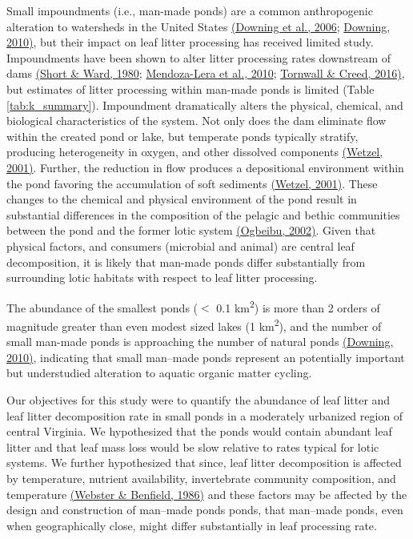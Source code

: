 \documentclass[12pt,letter]{article}
\begin{document}
Small impoundments (i.e., man-made ponds) are a common anthropogenic alteration to watersheds in the United States \hyperref[csl:26]{(Downing et al., 2006}; \hyperref[csl:27]{Downing, 2010)}, but their impact on leaf litter processing has received limited study. Impoundments have been shown to alter litter processing rates downstream of dams \hyperref[csl:28]{(Short \& Ward, 1980}; \hyperref[csl:29]{Mendoza-Lera et al., 2010}; \hyperref[csl:30]{Tornwall \& Creed, 2016)}, but estimates of litter processing within man-made ponds is limited (Table \ref{tab:k_summary}). Impoundment dramatically alters the physical, chemical, and biological characteristics of the system. Not only does the dam eliminate flow within the created pond or lake, but temperate ponds typically stratify, producing heterogeneity in oxygen, and other dissolved components \hyperref[csl:31]{(Wetzel, 2001)}. Further, the reduction in flow produces a depositional environment within the pond favoring the accumulation of soft sediments \hyperref[csl:31]{(Wetzel, 2001)}. These changes to the chemical and physical environment of the pond result in substantial differences in the composition of the pelagic and bethic communities between the pond and the former lotic system \hyperref[csl:32]{(Ogbeibu, 2002)}. Given that physical factors, and consumers (microbial and animal) are central leaf decomposition, it is likely that man-made ponds differ substantially from surrounding lotic habitats with respect to leaf litter processing.

The abundance of the smallest ponds ($<$ 0.1 km\textsuperscript{2}) is more than 2 orders of magnitude greater than even modest sized lakes (1 km\textsuperscript{2}), and the number of small man-made ponds is approaching the number of natural ponds \hyperref[csl:27]{(Downing, 2010)}, indicating that small man--made ponds represent an potentially important but understudied alteration to aquatic organic matter cycling.

Our objectives for this study were to quantify the abundance of leaf litter and leaf litter decomposition rate in small ponds in a moderately urbanized region of central Virginia. We hypothesized that the ponds would contain abundant leaf litter and that leaf mass loss would be slow relative to rates typical for lotic systems. We further hypothesized that since, leaf litter decomposition is affected by temperature, nutrient availability, invertebrate community composition, and temperature \hyperref[csl:13]{(Webster \& Benfield, 1986)} and these factors may be affected by the design and construction of man--made ponds ponds, that man--made ponds, even when geographically close, might differ substantially in leaf processing rate. 
\end{document}
